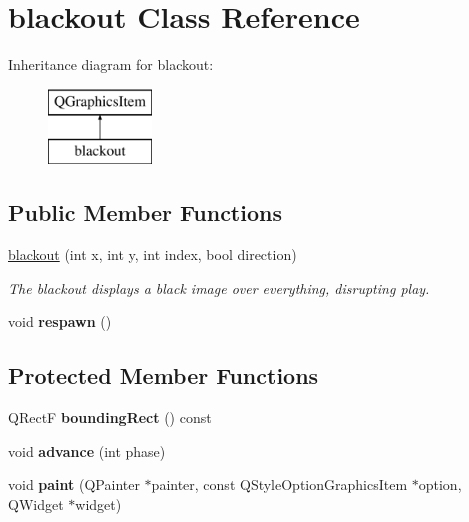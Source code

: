 \hypertarget{classblackout}{\section{blackout Class Reference}
\label{classblackout}
}
Inheritance diagram for blackout\-:\begin{figure}[H]
\begin{center}
\leavevmode
\includegraphics[height=2.000000cm]{classblackout}
\end{center}
\end{figure}
\subsection*{Public Member Functions}
\begin{DoxyCompactItemize}
\item 
\hyperlink{classblackout_a1e8c7f06ebea0ab98c2ea0aab0c72300}{blackout} (int x, int y, int index, bool direction)
\begin{DoxyCompactList}\small\item\em The blackout displays a black image over everything, disrupting play. \end{DoxyCompactList}\item 
\hypertarget{classblackout_aff541e3caaa1ba4db81bde5d5e822fe7}{void {\bfseries respawn} ()}\label{classblackout_aff541e3caaa1ba4db81bde5d5e822fe7}

\end{DoxyCompactItemize}
\subsection*{Protected Member Functions}
\begin{DoxyCompactItemize}
\item 
\hypertarget{classblackout_af5d2e60c2b84a2669b32f6a4c6db568f}{Q\-Rect\-F {\bfseries bounding\-Rect} () const }\label{classblackout_af5d2e60c2b84a2669b32f6a4c6db568f}

\item 
\hypertarget{classblackout_a4fd80f944889504df0f257cae59a3e80}{void {\bfseries advance} (int phase)}\label{classblackout_a4fd80f944889504df0f257cae59a3e80}

\item 
\hypertarget{classblackout_a5e22133a5308e7a4cbeeff58a8a87547}{void {\bfseries paint} (Q\-Painter $\ast$painter, const Q\-Style\-Option\-Graphics\-Item $\ast$option, Q\-Widget $\ast$widget)}\label{classblackout_a5e22133a5308e7a4cbeeff58a8a87547}

\end{DoxyCompactItemize}

